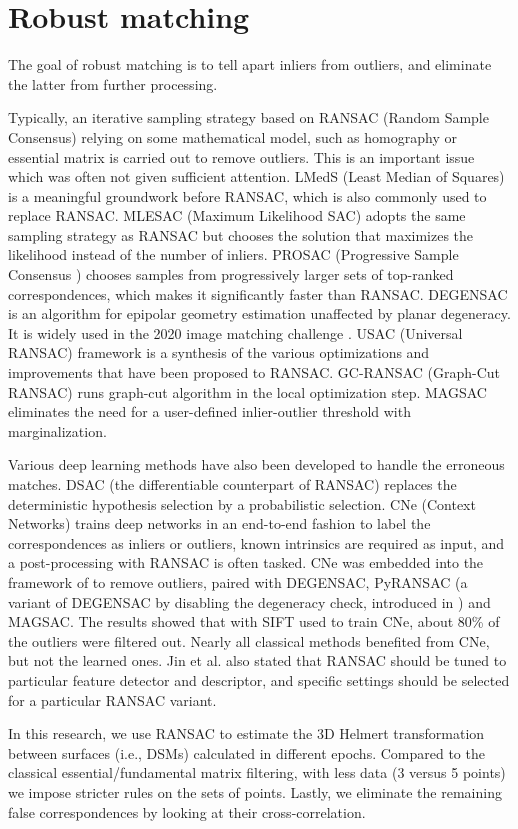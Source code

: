 \section{Robust matching}
The goal of robust matching is to tell apart inliers from outliers, and eliminate the latter from further processing.
\par
Typically, an iterative sampling strategy based on RANSAC (Random Sample Consensus) \cite{fischler1981random} relying on some mathematical model, such as homography \cite{sonka2014image} or essential matrix \cite{sonka2014image} is carried out to remove outliers. 
This is an important issue which was often not given sufficient attention.
LMedS (Least Median of Squares) \cite{leroy1987robust} is a meaningful groundwork before RANSAC, which is also commonly used to replace RANSAC.
MLESAC (Maximum Likelihood SAC)  \cite{torr2000mlesac} adopts the same sampling strategy as RANSAC but chooses the solution that maximizes the likelihood instead of the number of inliers. PROSAC (Progressive Sample Consensus ) \cite{chum2005matching} chooses samples from progressively larger sets of top-ranked correspondences, which makes it significantly faster than RANSAC. DEGENSAC \cite{chum2005two} is an algorithm for epipolar geometry estimation unaffected by planar degeneracy. It is widely used in the 2020 image matching challenge \cite{imagematchingchallenge2020}.
USAC (Universal RANSAC) \cite{raguram2012usac} framework is a synthesis of the various optimizations and improvements that have been proposed to RANSAC.
GC-RANSAC (Graph-Cut RANSAC) \cite{barath2018graph} runs graph-cut algorithm in the local optimization step.
MAGSAC \cite{barath2019magsac} eliminates the need for a user-defined inlier-outlier threshold with marginalization.
\par
Various deep learning methods have also been developed to handle the erroneous matches.
DSAC (the differentiable counterpart of RANSAC) \cite{brachmann2017dsac} replaces the deterministic hypothesis selection by a probabilistic selection.
CNe (Context Networks) \cite{moo2018learning} trains deep networks in an end-to-end fashion to label the correspondences as inliers or outliers, known intrinsics are required as input, and a post-processing with RANSAC is often tasked. CNe was embedded into the framework of \cite{jin2020image} to remove outliers, paired with DEGENSAC, PyRANSAC (a variant of DEGENSAC by disabling the degeneracy check, introduced in \cite{jin2020image}) and MAGSAC. The results showed that with SIFT used to train CNe, about 80\% of the outliers were filtered out. Nearly all classical methods benefited from CNe, but not the learned ones. Jin et al. \cite{jin2020image} also stated that RANSAC should be tuned to particular feature detector and descriptor, and specific settings should be selected for a particular RANSAC variant.
\par
In this research, we use RANSAC to estimate the 3D Helmert transformation between surfaces (i.e., DSMs) calculated in different epochs. Compared to the classical essential/fundamental matrix filtering, with less data (3 versus 5 points) we impose stricter rules on the sets of points. Lastly, we eliminate the remaining false correspondences by looking at their cross-correlation.
